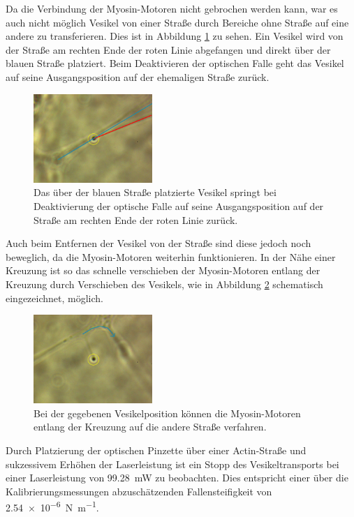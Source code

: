         \FloatBarrier 
        Da die Verbindung der Myosin-Motoren nicht gebrochen werden kann, war es auch nicht möglich Vesikel von einer Straße durch Bereiche ohne Straße auf eine andere zu transferieren. Dies ist in Abbildung
        \ref{fig:vesikel_overlap} zu sehen. Ein Vesikel wird von der Straße am rechten Ende der roten Linie abgefangen und direkt über der blauen Straße platziert. Beim Deaktivieren der optischen Falle geht das 
        Vesikel auf seine Ausgangsposition auf der ehemaligen Straße zurück.
        \FloatBarrier
        \begin{figure}[h]
        \centering
        \includegraphics[width = 0.4\textwidth]{pictures/vesikel_overlap.png}
        \caption{Das über der blauen Straße platzierte Vesikel springt bei Deaktivierung der optische Falle auf seine Ausgangsposition auf der Straße am rechten Ende der roten Linie zurück.}
        \label{fig:vesikel_overlap}
        \end{figure}
        \FloatBarrier 
        \newpage
        Auch beim Entfernen der Vesikel von der Straße sind diese jedoch noch beweglich, da die Myosin-Motoren weiterhin funktionieren. In der Nähe einer Kreuzung ist so das schnelle verschieben der 
        Myosin-Motoren entlang der Kreuzung durch Verschieben des Vesikels, wie in Abbildung \ref{fig:vesikel_sprung} schematisch eingezeichnet, möglich.
        \FloatBarrier
        \begin{figure}[h]
        \centering
        \includegraphics[width = 0.4\textwidth]{pictures/vesikel_transport.png}
        \caption{Bei der gegebenen Vesikelposition können die Myosin-Motoren entlang der Kreuzung auf die andere Straße verfahren.}
        \label{fig:vesikel_sprung}
        \end{figure}
        \FloatBarrier 
        Durch Platzierung der optischen Pinzette über einer Actin-Straße und sukzessivem Erhöhen der Laserleistung ist ein Stopp des Vesikeltransports bei einer Laserleistung von \SI{99.28}{\milli\watt} zu 
        beobachten. Dies entspricht einer über die Kalibrierungsmessungen abzuschätzenden Fallensteifigkeit von \SI{2.54e-6}{\newton\per\metre}. 